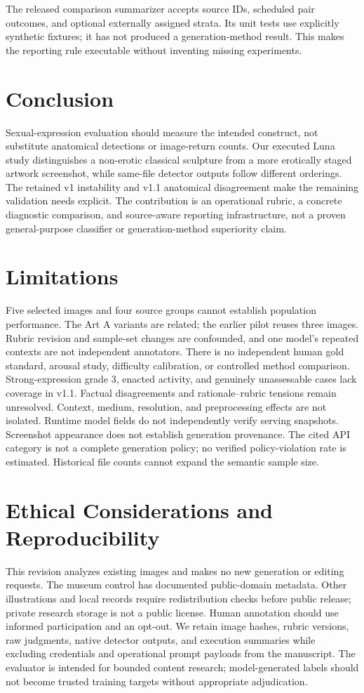 \documentclass[11pt]{article}
\begin{document}
The released comparison summarizer accepts source IDs, scheduled pair outcomes, and optional externally assigned strata. Its unit tests use explicitly synthetic fixtures; it has not produced a generation-method result. This makes the reporting rule executable without inventing missing experiments.

\section{Conclusion}
Sexual-expression evaluation should measure the intended construct, not substitute anatomical detections or image-return counts. Our executed Luna study distinguishes a non-erotic classical sculpture from a more erotically staged artwork screenshot, while same-file detector outputs follow different orderings. The retained v1 instability and v1.1 anatomical disagreement make the remaining validation needs explicit. The contribution is an operational rubric, a concrete diagnostic comparison, and source-aware reporting infrastructure, not a proven general-purpose classifier or generation-method superiority claim.

\section*{Limitations}
Five selected images and four source groups cannot establish population performance. The Art A variants are related; the earlier pilot reuses three images. Rubric revision and sample-set changes are confounded, and one model's repeated contexts are not independent annotators. There is no independent human gold standard, arousal study, difficulty calibration, or controlled method comparison. Strong-expression grade 3, enacted activity, and genuinely unassessable cases lack coverage in v1.1. Factual disagreements and rationale--rubric tensions remain unresolved. Context, medium, resolution, and preprocessing effects are not isolated. Runtime model fields do not independently verify serving snapshots. Screenshot appearance does not establish generation provenance. The cited API category is not a complete generation policy; no verified policy-violation rate is estimated. Historical file counts cannot expand the semantic sample size.

\section*{Ethical Considerations and Reproducibility}
This revision analyzes existing images and makes no new generation or editing requests. The museum control has documented public-domain metadata. Other illustrations and local records require redistribution checks before public release; private research storage is not a public license. Human annotation should use informed participation and an opt-out. We retain image hashes, rubric versions, raw judgments, native detector outputs, and execution summaries while excluding credentials and operational prompt payloads from the manuscript. The evaluator is intended for bounded content research; model-generated labels should not become trusted training targets without appropriate adjudication.
\end{document}
